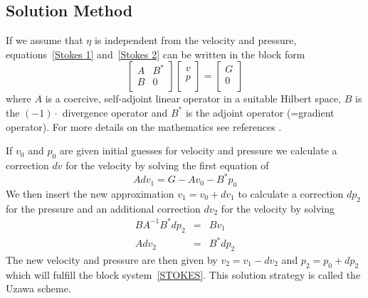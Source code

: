\subsection{Solution Method \label{STOKES SOLVE}}
If we assume that $\eta$ is independent from the velocity and pressure,
equations~\ref{Stokes 1} and~\ref{Stokes 2} can be written in the block form
\begin{equation}
\left[ \begin{array}{cc}
A     & B^{*} \\
B & 0 \\
\end{array} \right]
\left[ \begin{array}{c}
v \\
p \\
\end{array} \right]
=\left[ \begin{array}{c}
G \\
0 \\
\end{array} \right]
\label{STOKES}
\end{equation}
where $A$ is a coercive, self-adjoint linear operator in a suitable Hilbert
space, $B$ is the $(-1) \cdot$ divergence operator and $B^{*}$ is the adjoint
operator (=gradient operator).
For more details on the mathematics see references \cite{AAMIRBERKYAN2008,MBENZI2005}.

If $v_{0}$ and $p_{0}$ are given initial guesses for velocity and pressure we
calculate a correction $dv$ for the velocity by solving the first equation of
 \begin{equation}\label{STOKES ITER STEP 1}
 A dv_{1} = G - A v_{0} - B^{*} p_{0}
\end{equation}
We then insert the new approximation $v_{1}=v_{0}+dv_{1}$ to calculate a
correction $dp_{2}$ for the pressure and an additional correction $dv_{2}$ for
the velocity by solving
 \begin{equation}
 \begin{array}{rcl}
 B A^{-1} B^{*} dp_{2} & = & Bv_{1} \\
 A dv_{2} & = & B^{*} dp_{2} 
\end{array}
 \label{STOKES ITER STEP 2}
 \end{equation}
The new velocity and pressure are then given by $v_{2}=v_{1}-dv_{2}$ and
$p_{2}=p_{0}+dp_{2}$ which will fulfill the block system~\ref{STOKES}. 
This solution strategy is called the Uzawa scheme.


